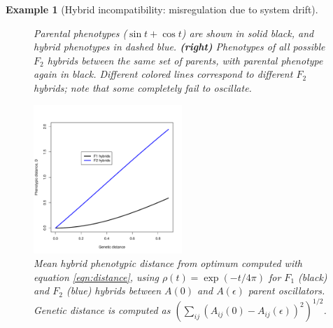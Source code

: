 \documentclass{article}
\newcommand{\plr}[1]{\todo[color=blue!25]{#1}}
\newcommand{\plr}[1]{{\color{blue}\it #1}}
\newcommand{\1}{\mathbbm{1}}
\newtheorem{example}{Example}
\begin{document}
\begin{example}[Hybrid incompatibility: misregulation due to system drift]
\begin{figure}[H]
{    %
    Parental phenotypes ($\sin t + \cos t$) are shown in solid black, and hybrid phenotypes in dashed blue.
    \textbf{(right)} Phenotypes of all possible $F_2$ hybrids between the same set of parents,
    with parental phenotype again in black.
    Different colored lines correspond to different $F_2$ hybrids;
    note that some completely fail to oscillate.
  } \label{fig:hybs}
\end{figure}

  \begin{figure}[H]
    \centering
    \includegraphics[width=0.5\textwidth]{examples/F2_vs_F1_divergence_tau0}
    \caption{Mean hybrid phenotypic distance from optimum computed with equation \eqref{eqn:distance}, using $\rho(t) = \exp(-t/4\pi)$
    for $F_1$ (black) and $F_2$ (blue) hybrids between $A(0)$ and $A(\epsilon)$ parent oscillators. Genetic distance is computed as 
    $\left(\sum_{ij} (A_{ij}(0) - A_{ij}(\epsilon))^2\right)^{1/2}$.
    }
    \label{fig:osc_incompat}
  \end{figure}
\end{example}
\end{document}
